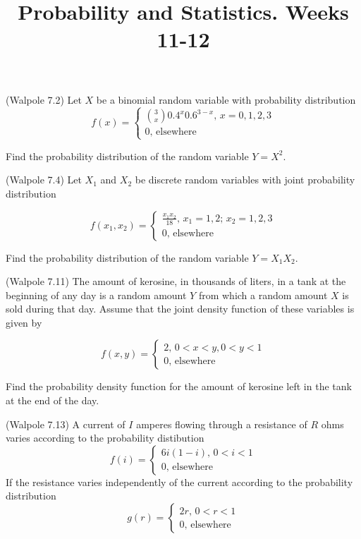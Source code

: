 \documentclass[14pt]{exam}
\title{Probability and Statistics. Weeks 11-12}
\date{}
\begin{document}
	\maketitle

	\begin{questions}
		\question
		(Walpole 7.2)
		Let $X$ be a binomial random variable with probability distribution
		$$
			f(x) = \begin{cases}
				\binom{3}{x} 0.4^x 0.6^{3 - x},\,x = 0, 1, 2, 3\\
				0,\,\text{elsewhere}
			\end{cases}
		$$
		
		Find the probability distribution of the random variable $Y = X^2$.
		
		\question
		(Walpole 7.4)
		Let $X_1$ and $X_2$ be discrete random variables with joint probability distribution
		
		$$
			f(x_1, x_2) = \begin{cases}
				\frac{x_1x_2}{18},\,x_1 = 1, 2;\,x_2 = 1,2,3\\
				0,\,\text{elsewhere}
			\end{cases}
		$$
		
		Find the probability distribution of the random variable $Y = X_1X_2$.
		
		\question
		(Walpole 7.11) The amount of kerosine, in thousands of liters, in a tank at the beginning of any day is a random amount $Y$ from which a random amount $X$ is sold during that day. Assume that the joint density function of these variables is given by
		
		$$
			f(x, y) = \begin{cases}
				2,\, 0 < x < y, 0 < y < 1\\
				0,\,\text{elsewhere}
			\end{cases}
		$$
		
		Find the probability density function for the amount of kerosine left in the tank at the end of the day.
		
		\question
		(Walpole 7.13)
		A current of $I$ amperes flowing through a resistance of $R$ ohms varies according to the probability distibution
		$$
			f(i) = \begin{cases}
				6i(1 - i),\, 0 < i < 1\\
				0,\,\text{elsewhere}
			\end{cases}
		$$
		If the resistance varies independently of the current according to the probability distribution
		$$
			g(r) = \begin{cases}
				2r,\,0 < r < 1\\
				0,\,\text{elsewhere}
			\end{cases}
		$$
		

\end{questions}
\end{document}
